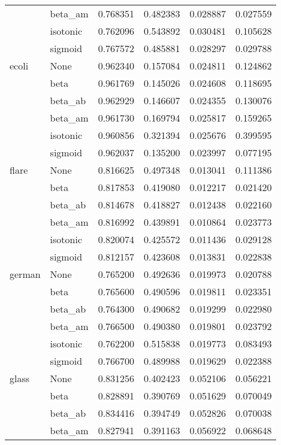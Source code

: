 \begin{tabular}{llrrrr}
        & beta\_am &  0.768351 &  0.482383 &  0.028887 &  0.027559 \\
        & isotonic &  0.762096 &  0.543892 &  0.030481 &  0.105628 \\
        & sigmoid &  0.767572 &  0.485881 &  0.028297 &  0.029788 \\
ecoli & None &  0.962340 &  0.157084 &  0.024811 &  0.124862 \\
        & beta &  0.961769 &  0.145026 &  0.024608 &  0.118695 \\
        & beta\_ab &  0.962929 &  0.146607 &  0.024355 &  0.130076 \\
        & beta\_am &  0.961730 &  0.169794 &  0.025817 &  0.159265 \\
        & isotonic &  0.960856 &  0.321394 &  0.025676 &  0.399595 \\
        & sigmoid &  0.962037 &  0.135200 &  0.023997 &  0.077195 \\
flare & None &  0.816625 &  0.497348 &  0.013041 &  0.111386 \\
        & beta &  0.817853 &  0.419080 &  0.012217 &  0.021420 \\
        & beta\_ab &  0.814678 &  0.418827 &  0.012438 &  0.022160 \\
        & beta\_am &  0.816992 &  0.439891 &  0.010864 &  0.023773 \\
        & isotonic &  0.820074 &  0.425572 &  0.011436 &  0.029128 \\
        & sigmoid &  0.812157 &  0.423608 &  0.013831 &  0.022838 \\
german & None &  0.765200 &  0.492636 &  0.019973 &  0.020788 \\
        & beta &  0.765600 &  0.490596 &  0.019811 &  0.023351 \\
        & beta\_ab &  0.764300 &  0.490682 &  0.019299 &  0.022980 \\
        & beta\_am &  0.766500 &  0.490380 &  0.019801 &  0.023792 \\
        & isotonic &  0.762200 &  0.515838 &  0.019773 &  0.083493 \\
        & sigmoid &  0.766700 &  0.489988 &  0.019629 &  0.022388 \\
glass & None &  0.831256 &  0.402423 &  0.052106 &  0.056221 \\
        & beta &  0.828891 &  0.390769 &  0.051629 &  0.070049 \\
        & beta\_ab &  0.834416 &  0.394749 &  0.052826 &  0.070038 \\
        & beta\_am &  0.827941 &  0.391163 &  0.056922 &  0.068648 \\

\end{tabular}
